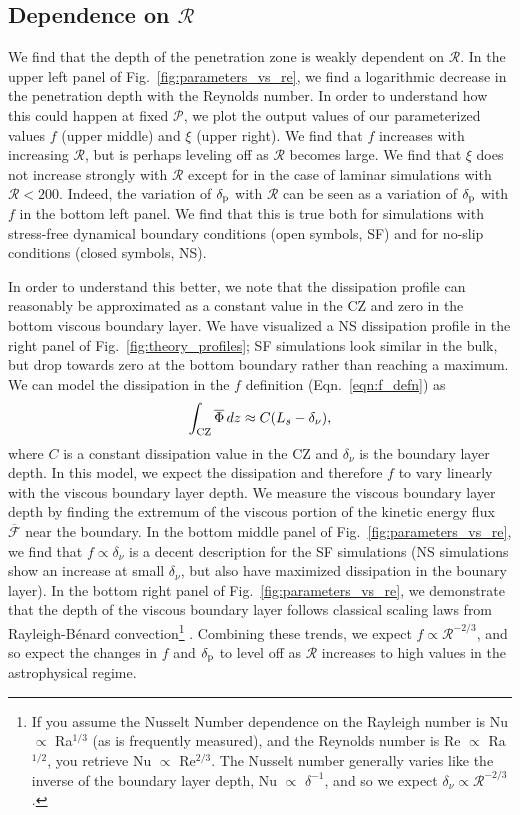 \documentclass[twocolumn]{aastex631}
\newcommand{\delp}{\ensuremath{\delta_{\rm{p}}}}
\newcommand{\mP}{\ensuremath{\mathcal{P}}}
\newcommand{\mR}{\ensuremath{\mathcal{R}}}
\renewcommand{\bar}[1]{\overline{#1}}
\begin{document}
\subsection{Dependence on $\mR$}

We find that the depth of the penetration zone is weakly dependent on $\mR$.
In the upper left panel of Fig.~\ref{fig:parameters_vs_re}, we find a logarithmic decrease in the penetration depth with the Reynolds number.
In order to understand how this could happen at fixed $\mP$, we plot the output values of our parameterized values $f$ (upper middle) and $\xi$ (upper right).
We find that $f$ increases with increasing $\mR$, but is perhaps leveling off as $\mR$ becomes large.
We find that $\xi$ does not increase strongly with $\mR$ except for in the case of laminar simulations with $\mR < 200$.
Indeed, the variation of $\delp$ with $\mR$ can be seen as a variation of $\delp$ with $f$ in the bottom left panel.
We find that this is true both for simulations with stress-free dynamical boundary conditions (open symbols, SF) and for no-slip conditions (closed symbols, NS).

In order to understand this better, we note that the dissipation profile can reasonably be approximated as a constant value in the CZ and zero in the bottom viscous boundary layer.
We have visualized a NS dissipation profile in the right panel of Fig.~\ref{fig:theory_profiles}; SF simulations look similar in the bulk, but drop towards zero at the bottom boundary rather than reaching a maximum.
We can model the dissipation in the $f$ definition (Eqn.~\ref{eqn:f_defn}) as
\begin{equation}
\int_{\rm{CZ}} \bar{\Phi}\,dz \approx C ( L_s - \delta_\nu ),
\end{equation}
where $C$ is a constant dissipation value in the CZ and $\delta_\nu$ is the boundary layer depth.
In this model, we expect the dissipation and therefore $f$ to vary linearly with the viscous boundary layer depth.
We measure the viscous boundary layer depth by finding the extremum of the viscous portion of the kinetic energy flux $\bar{\mathcal{F}}$ near the boundary.
In the bottom middle panel of Fig.~\ref{fig:parameters_vs_re}, we find that $f \propto \delta_\nu$ is a decent description for the SF simulations (NS simulations show an increase at small $\delta_\nu$, but also have maximized dissipation in the bounary layer).
In the bottom right panel of Fig.~\ref{fig:parameters_vs_re}, we demonstrate that the depth of the viscous boundary layer follows classical scaling laws from Rayleigh-B\'{e}nard convection\footnote{
If you assume the Nusselt Number dependence on the Rayleigh number is Nu $\propto$ Ra$^{1/3}$ (as is frequently measured), and the Reynolds number is Re $\propto$ Ra$^{1/2}$, you retrieve Nu $\propto$ Re$^{2/3}$. 
The Nusselt number generally varies like the inverse of the boundary layer depth, Nu $\propto$ $\delta^{-1}$, and so we expect $\delta_{\nu} \propto \mR^{-2/3}$.} \citep{ahlers_etal_2009, goluskin2016}.
Combining these trends, we expect $f \propto \mR^{-2/3}$, and so expect the changes in $f$ and $\delp$ to level off as $\mR$ increases to high values in the astrophysical regime.
\end{document}
